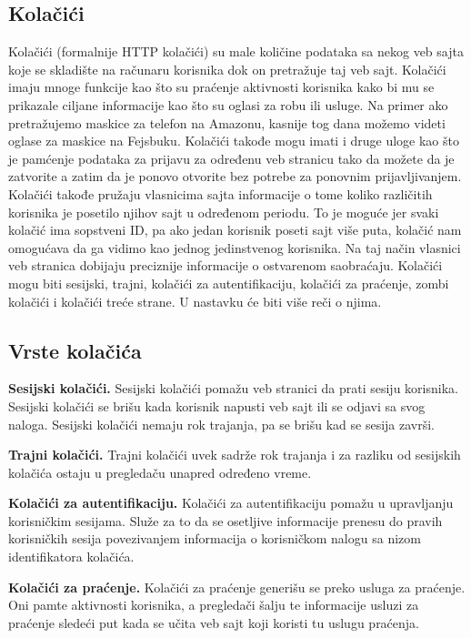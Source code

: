 \documentclass[a4paper]{article}
\begin{document}
	\subsection{Kolačići}
	\label{subsec:kolacici}
	Kolačići (formalnije HTTP kolačići) su male količine podataka sa nekog veb sajta koje se skladište na računaru korisnika dok on pretražuje taj veb sajt. Kolačići imaju mnoge funkcije kao što su praćenje aktivnosti korisnika kako bi mu se prikazale ciljane informacije kao što su oglasi za robu ili usluge. Na primer ako pretražujemo maskice za telefon na Amazonu, kasnije tog dana možemo videti oglase za maskice na Fejsbuku. Kolačići takođe mogu imati i druge uloge kao što je pamćenje podataka za prijavu za određenu veb stranicu tako da možete da je zatvorite a zatim da je ponovo otvorite bez potrebe za ponovnim prijavljivanjem. Kolačići takođe pružaju vlasnicima sajta informacije o tome koliko različitih korisnika je posetilo njihov sajt u određenom periodu. To je moguće jer svaki kolačić ima sopstveni ID, pa ako jedan korisnik poseti sajt više puta, kolačić nam omogućava da ga vidimo kao jednog jedinstvenog korisnika. Na taj način vlasnici veb stranica dobijaju preciznije informacije o ostvarenom saobraćaju. Kolačići mogu biti sesijski, trajni, kolačići za autentifikaciju, kolačići za praćenje, zombi kolačići i kolačići treće strane. U nastavku će biti više reči o njima. \cite{kolacici}
	
	\subsection{Vrste kolačića}
	\label{subsec:vrstekolacica}
	\textbf{Sesijski kolačići.} Sesijski kolačići pomažu veb stranici da prati sesiju korisnika. Sesijski kolačići se brišu kada korisnik napusti veb sajt ili se odjavi sa svog naloga. Sesijski kolačići nemaju rok trajanja, pa se brišu kad se sesija završi. 
	
	\textbf{Trajni kolačići.} Trajni kolačići uvek sadrže rok trajanja i za razliku od sesijskih kolačića ostaju u pregledaču unapred određeno vreme. 
	
	\textbf{Kolačići za autentifikaciju.} Kolačići za autentifikaciju pomažu u upravljanju korisničkim sesijama. Služe za to da se osetljive informacije prenesu do pravih korisničkih sesija povezivanjem informacija o korisničkom nalogu sa nizom identifikatora kolačića. 
	
	\textbf{Kolačići za praćenje.} Kolačići za praćenje generišu se preko usluga za praćenje. Oni pamte aktivnosti korisnika, a pregledači šalju te informacije usluzi za praćenje sledeći put kada se učita veb sajt koji koristi tu uslugu praćenja. 
	
\end{document}
